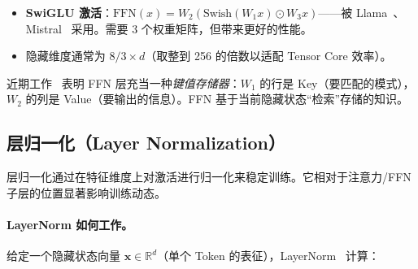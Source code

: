 \begin{itemize}
  \item \textbf{SwiGLU 激活}：$\text{FFN}(x) = W_2 (\text{Swish}(W_1 x) \odot W_3 x)$——被 Llama~\cite{grattafiori2024llama3}、Mistral~\cite{jiang2023mistral} 采用。需要 3 个权重矩阵，但带来更好的性能。
  \item 隐藏维度通常为 $8/3 \times d$（取整到 256 的倍数以适配 Tensor Core 效率）。
\end{itemize}

\begin{intuitionbox}[FFN 作为存储器]
近期工作~\cite{geva2021transformer} 表明 FFN 层充当一种\emph{键值存储器}：$W_1$ 的行是 Key（要匹配的模式），$W_2$ 的列是 Value（要输出的信息）。FFN 基于当前隐藏状态``检索''存储的知识。
\end{intuitionbox}

\subsection{层归一化（Layer Normalization）}
\label{layer-normalization}

层归一化通过在特征维度上对激活进行归一化来稳定训练。它相对于注意力/FFN 子层的位置显著影响训练动态。

\paragraph{LayerNorm 如何工作。}
\label{how-layernorm-works.}

给定一个隐藏状态向量 $\mathbf{x} \in \mathbb{R}^d$（单个 Token 的表征），LayerNorm~\cite{ba2016layernorm} 计算：

